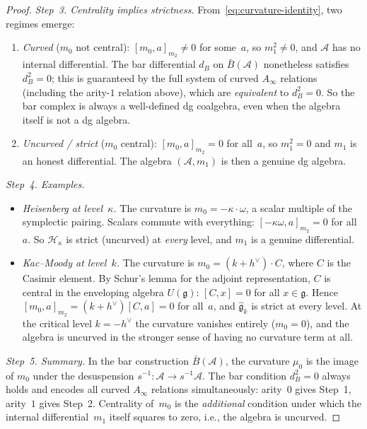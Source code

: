 \begin{proof}
\emph{Step~3. Centrality implies strictness.}
From~\eqref{eq:curvature-identity}, two regimes emerge:

\begin{enumerate}[label=(\roman*)]
\item \emph{Curved} ($m_0$ not central): $[m_0, a]_{m_2} \neq 0$ for
some~$a$, so $m_1^2 \neq 0$, and $\mathcal{A}$ has no internal
differential.  The bar differential $d_B$ on $\bar{B}(\mathcal{A})$
nonetheless satisfies $d_B^2 = 0$; this is guaranteed by the full
system of curved $A_\infty$ relations (including the arity-$1$
relation above), which are \emph{equivalent} to $d_B^2 = 0$.  So the
bar complex is always a well-defined dg coalgebra, even when the
algebra itself is not a dg algebra.

\item \emph{Uncurved / strict} ($m_0$ central): $[m_0, a]_{m_2} = 0$
for all~$a$, so $m_1^2 = 0$ and $m_1$ is an honest differential.
The algebra $(\mathcal{A}, m_1)$ is then a genuine dg algebra.
\end{enumerate}

\emph{Step~4. Examples.}
\begin{itemize}
\item \emph{Heisenberg at level~$\kappa$.}  The curvature is
$m_0 = -\kappa \cdot \omega$, a scalar multiple of the symplectic
pairing.  Scalars commute with everything:
$[-\kappa \omega, a]_{m_2} = 0$ for all~$a$.  So $\mathcal{H}_\kappa$
is strict (uncurved) at \emph{every} level, and $m_1$ is a genuine
differential.

\item \emph{Kac--Moody at level~$k$.}  The curvature is
$m_0 = (k + h^\vee) \cdot C$, where $C$ is the Casimir element.
By Schur's lemma for the adjoint representation, $C$ is central in
the enveloping algebra $U(\mathfrak{g})$: $[C, x] = 0$ for all
$x \in \mathfrak{g}$.  Hence $[m_0, a]_{m_2} = (k+h^\vee)[C,a] = 0$
for all~$a$, and $\widehat{\mathfrak{g}}_k$ is strict at every level.
At the critical level $k = -h^\vee$ the curvature vanishes entirely
($m_0 = 0$), and the algebra is uncurved in the stronger sense of
having no curvature term at all.
\end{itemize}

\emph{Step~5. Summary.}
In the bar construction $\bar{B}(\mathcal{A})$, the curvature $\mu_0$
is the image of $m_0$ under the desuspension $s^{-1}\!: \mathcal{A}
\to s^{-1}\mathcal{A}$.  The bar condition $d_B^2 = 0$ always holds
and encodes all curved $A_\infty$ relations simultaneously: arity~$0$
gives Step~1, arity~$1$ gives Step~2.  Centrality of~$m_0$ is the
\emph{additional} condition under which the internal differential~$m_1$
itself squares to zero, i.e., the algebra is uncurved.
\end{proof}

